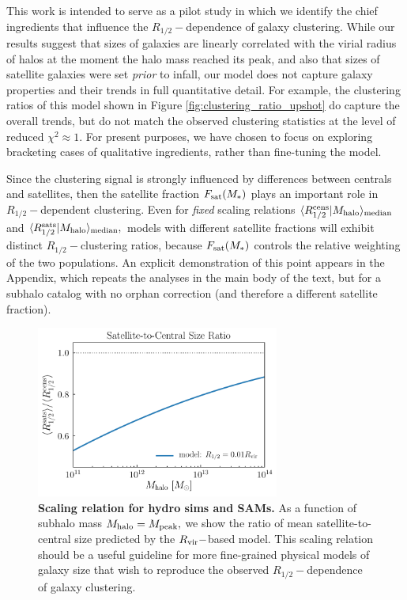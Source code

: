 \documentclass[usenatbib,usegraphicx,letterpaper]{mn2e}
\newcommand{\rhalf}{R_{1/2}}
\newcommand{\mstar}{M_{\ast}}
\newcommand{\mpeak}{M_{\rm peak}}
\newcommand{\mhalo}{M_{\rm halo}}
\newcommand{\rvir}{R_{\rm vir}}
\newcommand{\median}[2]{\langle{#1}\vert{#2}\rangle_{\rm median}}
\begin{document}
This work is intended to serve as a pilot study in which we identify the chief ingredients that influence the $\rhalf-$dependence of galaxy clustering. While our results suggest that sizes of galaxies are linearly correlated with the
virial radius of halos at the moment the halo mass reached its peak, and also that sizes of satellite galaxies were set {\em prior} to infall, our model does not capture galaxy properties and their trends in full quantitative detail.
For example, the clustering ratios of this model shown in Figure \ref{fig:clustering_ratio_upshot} do capture the overall trends, but do not match the observed clustering statistics at the level of reduced $\chi^2\approx 1.$ For present purposes, we have chosen to focus on exploring bracketing cases of qualitative ingredients, rather than fine-tuning the model.

Since the clustering signal is strongly influenced by differences between centrals and satellites, then the satellite fraction $F_{\rm sat}(\mstar)$ plays an important role in $\rhalf-$dependent clustering. Even for {\em fixed} scaling relations $\median{\rhalf^{\rm cens}}{\mhalo}$ and $\median{\rhalf^{\rm sats}}{\mhalo},$ models with different satellite fractions will exhibit distinct $\rhalf-$clustering ratios, because $F_{\rm sat}(\mstar)$ controls the relative weighting of the two populations. An explicit demonstration of this point appears in the Appendix, which repeats the analyses in the main body of the text, but for a subhalo catalog with no orphan correction (and therefore a different satellite fraction).

\begin{figure}
\centering
\includegraphics[width=8cm]{FIGS/cen_sat_size_ratios.pdf}
\caption{
{\bf Scaling relation for hydro sims and SAMs.}
As a function of subhalo mass $\mhalo=\mpeak,$ we show the ratio of mean satellite-to-central size predicted by the $\rvir-$based model. This scaling relation should be a useful guideline for more fine-grained physical models of galaxy size that wish to reproduce the observed $\rhalf-$dependence of galaxy clustering.
}
\label{fig:censatsizeratios}
\end{figure}
\end{document}
